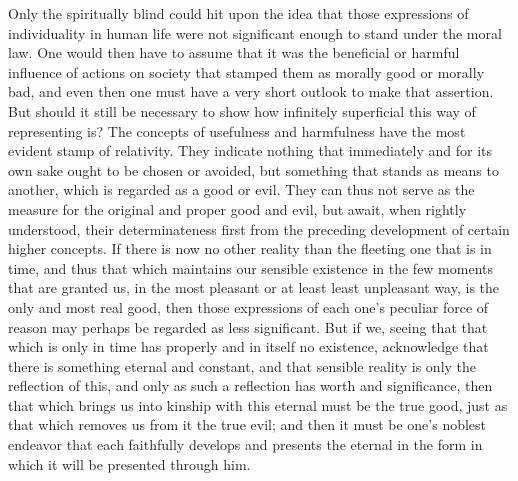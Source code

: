 \documentclass[12pt,a4paper,openany]{book}
\newcommand{\opage}[1]{\marginnote{\footnotesize\textit{[#1]}}}
\begin{document}
Only the spiritually blind could hit upon the idea that those expressions of
individuality in human life were not significant enough to stand under the moral
law. One would then have to assume that it was the beneficial or harmful influence of
actions on society that stamped them as morally good or morally bad, and even then
one must have a very short outlook to make that assertion. But should it still be
necessary to show how infinitely superficial this way of representing is? The
concepts of usefulness and harmfulness have the most evident stamp of relativity.
They indicate nothing that immediately and for its own sake ought to be chosen or
avoided, but something that stands as means to another, which is regarded as a good
or evil. They can thus not serve as the measure for the original and proper good and
evil, but await, when rightly understood, their determinateness first from the
preceding development of certain higher concepts. If there is now no other reality
than the fleeting one that is in time, and thus that which maintains our sensible
existence in the few moments that are granted us, in the most pleasant or at least
least unpleasant way, is
\setcounter{footnote}{0}%
\opage{87}the only and most real good, then those expressions of each one's peculiar force
of reason may perhaps be regarded as less significant. But if we, seeing that that
which is only in time has properly and in itself no existence, acknowledge that
there is something eternal and constant, and that sensible reality is only the
reflection of this, and only as such a reflection has worth and significance, then
that which brings us into kinship with this eternal must be the true good, just as
that which removes us from it the true evil; and then it must be one's noblest
endeavor that each faithfully develops and presents the eternal in the form in which
it will be presented through him.
\end{document}
